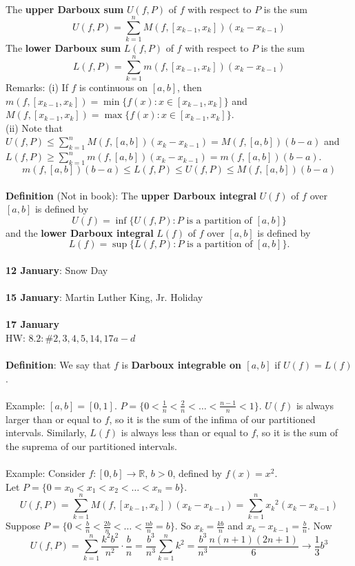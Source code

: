 \documentclass[12pt]{article}
\begin{document}
\\
The {\bf upper Darboux sum} $U(f,P)$ of $f$ with respect to $P$ is the sum
$$U(f,P)=\sum_{k=1}^n M(f,[x_{k-1},x_k])(x_k-x_{k-1})$$
The {\bf lower Darboux sum} $L(f,P)$ of $f$ with respect to $P$ is the sum
$$L(f,P)=\sum_{k=1}^n m(f,[x_{k-1},x_k])(x_k-x_{k-1})$$
Remarks: (i) If $f$ is continuous on $[a,b]$, then $m(f,[x_{k-1},x_k])=\min\{f(x):x\in[x_{k-1},x_k]\}$ and $M(f,[x_{k-1},x_k])=\max\{f(x):x\in[x_{k-1},x_k]\}$.\\
(ii) Note that $U(f,P)\leq\sum_{k=1}^n M(f,[a,b])(x_k-x_{k-1})=M(f,[a,b])(b-a)$ and $L(f,P)\geq\sum_{k=1}^n m(f,[a,b])(x_k-x_{k-1})=m(f,[a,b])(b-a)$.\\
\begin{equation}
m(f,[a,b])(b-a)\leq L(f,P)\leq U(f,P)\leq M(f,[a,b])(b-a)
\end{equation}
\\
{\bf Definition} (Not in book): The {\bf upper Darboux integral} $U(f)$ of $f$ over $[a,b]$ is defined by
$$U(f)=\inf\{U(f,P): P\text{ is a partition of }[a,b]\}$$
and the {\bf lower Darboux integral} $L(f)$ of $f$ over $[a,b]$ is defined by
$$L(f)=\sup\{L(f,P): P\text{ is a partition of }[a,b]\}.$$
\\
{\bf 12 January}: Snow Day\\
\\
{\bf 15 January}: Martin Luther King, Jr. Holiday\\
\\
{\bf 17 January}\\
HW: $8.2:{}\#2,3,4,5,14,17a-d$\\
\\
{\bf Definition}: We say that $f$ is {\bf Darboux integrable on $[a,b]$} if $U(f)=L(f)$.\\
\\
Example: $[a,b]=[0,1]$. $P=\{0<\frac1n<\frac2n<\ldots<\frac{n-1}n<1\}$. $U(f)$ is always larger than or equal to $f$, so it is the sum of the infima of our partitioned intervals. Similarly, $L(f)$ is always less than or equal to $f$, so it is the sum of the suprema of our partitioned intervals.\\
\\
Example: Consider $f:[0,b]\rightarrow\mathbb{R}$, $b>0$, defined by $f(x)=x^2$.\\
Let $P=\{0=x_0<x_1<x_2<\ldots<x_n=b\}$.
$$U(f,P)=\sum_{k=1}^n M(f,[x_{k-1},x_k])(x_k-x_{k-1})=\sum_{k=1}^n {x_k}^2(x_k-x_{k-1})$$
Suppose $P=\{0<\frac{b}n<\frac{2b}n<\ldots<\frac{nb}n=b\}$. So $x_k=\frac{kb}n$ and $x_k-x_{k-1}=\frac{b}n$. Now
$$U(f,P)=\sum_{k=1}^n \frac{k^2b^2}{n^2}\cdot\frac{b}n=\frac{b^3}{n^3}\sum_{k=1}^n k^2=\frac{b^3}{n^3}\frac{n(n+1)(2n+1)}{6}\rightarrow\frac13b^3$$
\end{document}

